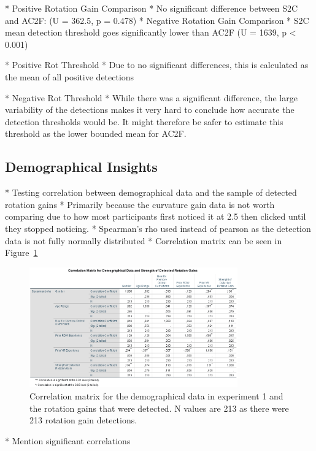* Positive Rotation Gain Comparison
   * No significant difference between S2C and AC2F: (U = 362.5, p = 0.478)
* Negative Rotation Gain Comparison
   * S2C mean detection threshold goes significantly lower than AC2F (U = 1639, p < 0.001)
   
* Positive Rot Threshold
   * Due to no significant differences, this is calculated as the mean of all positive detections
   
* Negative Rot Threshold
   * While there was a significant difference, the large variability of the detections makes it very hard to conclude how accurate the detection thresholds would be. It might therefore be safer to estimate this threshold as the lower bounded mean for AC2F.

\subsection{Demographical Insights}
* Testing correlation between demographical data and the sample of detected rotation gains
   * Primarily because the curvature gain data is not worth comparing due to how most participants first noticed it at 2.5 then clicked until they stopped noticing. 
* Spearman's rho used instead of pearson as the detection data is not fully normally distributed
* Correlation matrix can be seen in Figure~\ref{fig:ex1demogcorrelationmatrix}

\begin{figure}[tbph]
    \centering
    \includegraphics[width=0.8\textwidth]{figures/graphs/DemographicalCorrelations.png}
    \caption[Experiment 1 Demographical Correlation Matrix]{Correlation matrix for the demographical data in experiment 1 and the rotation gains that were detected. N values are 213 as there were 213 rotation gain detections.}
    \label{fig:ex1demogcorrelationmatrix}
\end{figure}

* Mention significant correlations

